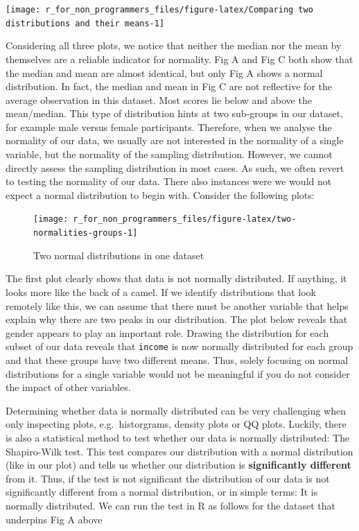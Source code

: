 \documentclass[
]{book}
\begin{document}
\begin{center}\texttt{[image: r\_for\_non\_programmers\_files/figure-latex/Comparing two distributions and their means-1]} \end{center}

Considering all three plots, we notice that neither the median nor the mean by themselves are a reliable indicator for normality. Fig A and Fig C both show that the median and mean are almost identical, but only Fig A shows a normal distribution. In fact, the median and mean in Fig C are not reflective for the average observation in this dataset. Most scores lie below and above the mean/median. This type of distribution hints at two sub-groups in our dataset, for example male versus female participants. Therefore, when we analyse the normality of our data, we usually are not interested in the normality of a single variable, but the normality of the sampling distribution. However, we cannot directly assess the sampling distribution in most cases. As such, we often revert to testing the normality of our data. There also instances were we would not expect a normal distribution to begin with. Consider the following plots:

\begin{figure}

{\centering \texttt{[image: r\_for\_non\_programmers\_files/figure-latex/two-normalities-groups-1]} 

}

\caption{Two normal distributions in one dataset}\label{fig:two-normalities-groups}
\end{figure}

The first plot clearly shows that data is not normally distributed. If anything, it looks more like the back of a camel. If we identify distributions that look remotely like this, we can assume that there must be another variable that helps explain why there are two peaks in our distribution. The plot below reveals that gender appears to play an important role. Drawing the distribution for each subset of our data reveals that \texttt{income} is now normally distributed for each group and that these groups have two different means. Thus, solely focusing on normal distributions for a single variable would not be meaningful if you do not consider the impact of other variables.

Determining whether data is normally distributed can be very challenging when only inspecting plots, e.g.~historgrams, density plots or QQ plots. Luckily, there is also a statistical method to test whether our data is normally distributed: The Shapiro-Wilk test. This test compares our distribution with a normal distribution (like in our plot) and tells us whether our distribution is \textbf{significantly different} from it. Thus, if the test is not significant the distribution of our data is not significantly different from a normal distribution, or in simple terms: It is normally distributed. We can run the test in R as follows for the dataset that underpins Fig A above
\end{document}
